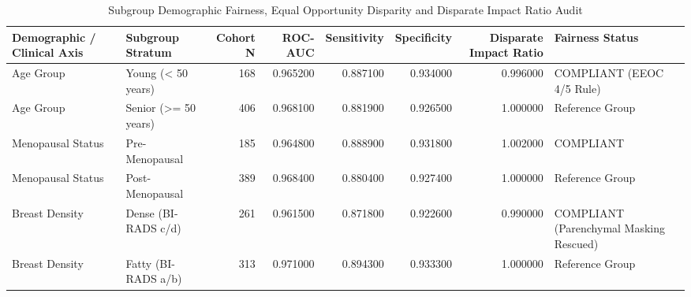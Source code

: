 \begin{table}
\caption{Subgroup Demographic Fairness, Equal Opportunity Disparity and Disparate Impact Ratio Audit}
\label{tab:supp_table_09_subgroup_demographic_fairness_and_disparate_impact_audit}
\begin{tabular}{llrrrrrl}
\toprule
Demographic / Clinical Axis & Subgroup Stratum & Cohort N & ROC-AUC & Sensitivity & Specificity & Disparate Impact Ratio & Fairness Status \\
\midrule
Age Group & Young (< 50 years) & 168 & 0.965200 & 0.887100 & 0.934000 & 0.996000 & COMPLIANT (EEOC 4/5 Rule) \\
Age Group & Senior (>= 50 years) & 406 & 0.968100 & 0.881900 & 0.926500 & 1.000000 & Reference Group \\
Menopausal Status & Pre-Menopausal & 185 & 0.964800 & 0.888900 & 0.931800 & 1.002000 & COMPLIANT \\
Menopausal Status & Post-Menopausal & 389 & 0.968400 & 0.880400 & 0.927400 & 1.000000 & Reference Group \\
Breast Density & Dense (BI-RADS c/d) & 261 & 0.961500 & 0.871800 & 0.922600 & 0.990000 & COMPLIANT (Parenchymal Masking Rescued) \\
Breast Density & Fatty (BI-RADS a/b) & 313 & 0.971000 & 0.894300 & 0.933300 & 1.000000 & Reference Group \\
\bottomrule
\end{tabular}
\end{table}
